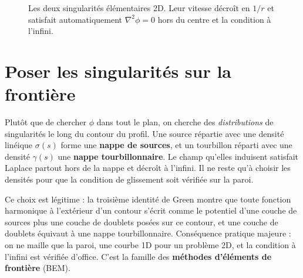 \begin{figure}[htbp]
\centering
{}
\caption{Les deux singularités élémentaires 2D. Leur vitesse décroît en $1/r$ et satisfait automatiquement $\nabla^2\phi=0$ hors du centre et la condition à l'infini.}
\end{figure}

\section{Poser les singularités sur la frontière}
Plutôt que de chercher $\phi$ dans tout le plan, on cherche des \emph{distributions} de singularités le long du contour du profil. Une source répartie avec une densité linéique $\sigma(s)$ forme une \textbf{nappe de sources}, et un tourbillon réparti avec une densité $\gamma(s)$ une \textbf{nappe tourbillonnaire}. Le champ qu'elles induisent satisfait Laplace partout hors de la nappe et décroît à l'infini. Il ne reste qu'à choisir les densités pour que la condition de glissement soit vérifiée sur la paroi.

Ce choix est légitime : la troisième identité de Green montre que toute fonction harmonique à l'extérieur d'un contour s'écrit comme le potentiel d'une couche de sources plus une couche de doublets posées sur ce contour, et une couche de doublets équivaut à une nappe tourbillonnaire. Conséquence pratique majeure : on ne maille que la paroi, une courbe 1D pour un problème 2D, et la condition à l'infini est vérifiée d'office. C'est la famille des \textbf{méthodes d'éléments de frontière} (BEM).

